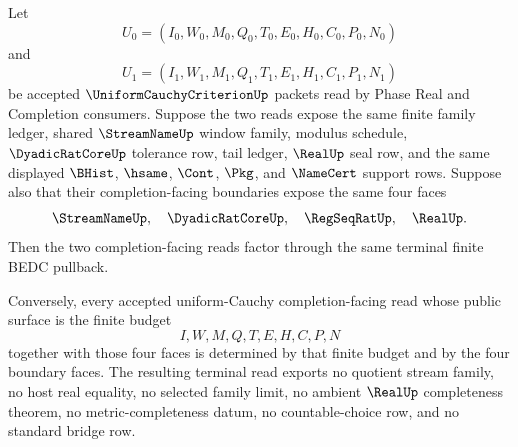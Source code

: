 \begin{theorem}
\label{thm:real-uniform-cauchy-four-object-terminal-determinacy}
Let
$$
U_0=(I_0,W_0,M_0,Q_0,T_0,E_0,H_0,C_0,P_0,N_0)
$$
and
$$
U_1=(I_1,W_1,M_1,Q_1,T_1,E_1,H_1,C_1,P_1,N_1)
$$
be accepted $\UniformCauchyCriterionUp$ packets read by Phase Real and
Completion consumers. Suppose the two reads expose the same finite family
ledger, shared $\StreamNameUp$ window family, modulus schedule,
$\DyadicRatCoreUp$ tolerance row, tail ledger, $\RealUp$ seal row, and the same
displayed $\BHist$, $\hsame$, $\Cont$, $\Pkg$, and $\NameCert$ support rows.
Suppose also that their completion-facing boundaries expose the same four
faces
$$
\StreamNameUp,\quad \DyadicRatCoreUp,\quad \RegSeqRatUp,\quad \RealUp.
$$
Then the two completion-facing reads factor through the same terminal finite
BEDC pullback.

Conversely, every accepted uniform-Cauchy completion-facing read whose public
surface is the finite budget
$$
I,W,M,Q,T,E,H,C,P,N
$$
together with those four faces is determined by that finite budget and by the
four boundary faces. The resulting terminal read exports no quotient stream
family, no host real equality, no selected family limit, no ambient $\RealUp$
completeness theorem, no metric-completeness datum, no countable-choice row,
and no standard bridge row.
\end{theorem}
